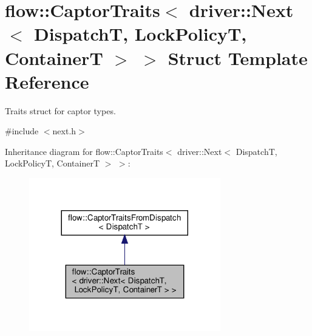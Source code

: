\hypertarget{structflow_1_1_captor_traits_3_01driver_1_1_next_3_01_dispatch_t_00_01_lock_policy_t_00_01_container_t_01_4_01_4}{}\section{flow\+:\+:Captor\+Traits$<$ driver\+:\+:Next$<$ DispatchT, Lock\+PolicyT, ContainerT $>$ $>$ Struct Template Reference}
\label{structflow_1_1_captor_traits_3_01driver_1_1_next_3_01_dispatch_t_00_01_lock_policy_t_00_01_container_t_01_4_01_4}


Traits struct for captor types.  




{\ttfamily \#include $<$next.\+h$>$}



Inheritance diagram for flow\+:\+:Captor\+Traits$<$ driver\+:\+:Next$<$ DispatchT, Lock\+PolicyT, ContainerT $>$ $>$\+:
\nopagebreak
\begin{figure}[H]
\begin{center}
\leavevmode
\includegraphics[width=236pt]{structflow_1_1_captor_traits_3_01driver_1_1_next_3_01_dispatch_t_00_01_lock_policy_t_00_01_conta17f27d6e99a8591c024bc9b6e5353043}
\end{center}
\end{figure}


